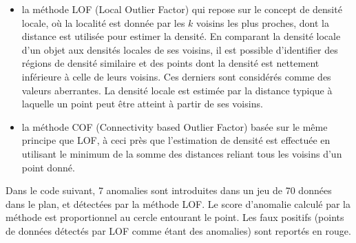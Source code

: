 \documentclass[letterpaper,10pt,french]{sphinxmanual}
\begin{document}
\begin{itemize}
\item {} 
\sphinxAtStartPar
la méthode LOF (Local Outlier Factor) qui repose sur le concept de densité locale, où la localité est donnée par les \(k\) voisins les plus proches, dont la distance est utilisée pour estimer la densité. En comparant la densité locale d’un objet aux densités locales de ses voisins, il est possible d’identifier des régions de densité similaire et des points dont la densité est nettement inférieure à celle de leurs voisins. Ces derniers sont considérés comme des valeurs aberrantes. La densité locale est estimée par la distance typique à laquelle un point peut être atteint à partir de ses voisins.

\item {} 
\sphinxAtStartPar
la méthode COF (Connectivity based Outlier Factor) basée sur le même principe que LOF, à ceci près que l’estimation de densité est effectuée en utilisant le minimum de la somme des distances reliant tous les voisins d’un point donné.

\end{itemize}

\sphinxAtStartPar
Dans le code suivant, 7 anomalies sont introduites dans un jeu de 70 données dans le plan, et détectées par la méthode LOF. Le score d’anomalie calculé par la méthode est proportionnel au cercle entourant le point. Les faux positifs (points de données détectés par LOF comme étant des anomalies) sont reportés en rouge.
\end{document}
